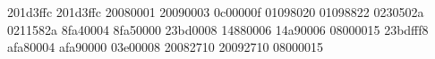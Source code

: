 201d3ffc
201d3ffc
20080001
20090003
0c00000f
01098020
01098822
0230502a
0211582a
8fa40004
8fa50000
23bd0008
14880006
14a90006
08000015
23bdfff8
afa80004
afa90000
03e00008
20082710
20092710
08000015
